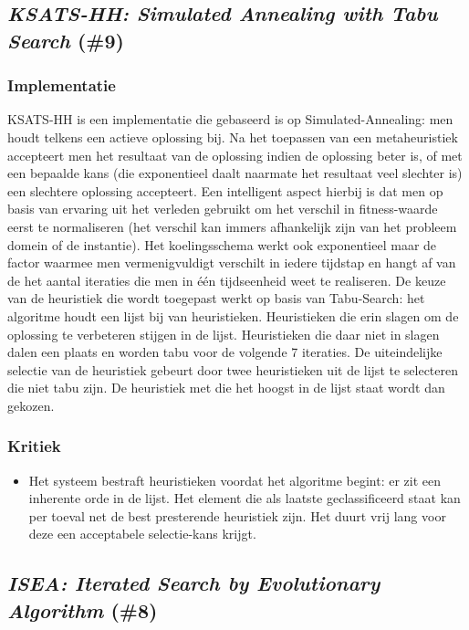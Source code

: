 \subsection{\emph{KSATS-HH: Simulated Annealing with Tabu Search} (\#9)}
\label{sss:ksats-hh}
\subsubsection{Implementatie}
KSATS-HH\cite{chesc-ksats-hh} is een implementatie die gebaseerd is op Si\-mu\-la\-ted-An\-nea\-ling: men houdt telkens een actieve oplossing bij. Na het toe\-passen van een metaheuristiek accepteert men het resultaat van de oplossing indien de oplossing beter is, of met een bepaalde kans (die exponentieel daalt naarmate het resultaat veel slechter is) een slechtere oplossing accepteert. Een intelligent aspect hierbij is dat men op basis van ervaring uit het verleden gebruikt om het verschil in fitness-waarde eerst te normaliseren (het verschil kan immers afhankelijk zijn van het probleem domein of de instantie). Het koelingsschema werkt ook exponentieel maar de factor waarmee men vermenigvuldigt verschilt in iedere tijdstap en hangt af van de het aantal iteraties die men in \'e\'en tijdseenheid weet te realiseren. De keuze van de heuristiek die wordt toegepast werkt op basis van Tabu-Search: het algoritme houdt een lijst bij van heuristieken. Heuristieken die erin slagen om de 
oplossing te verbeteren stijgen in de lijst. Heuristieken die daar niet in slagen dalen een plaats en worden tabu voor de volgende 7 iteraties. De uiteindelijke selectie van de heuristiek gebeurt door twee heuristieken uit de lijst te selecteren die niet tabu zijn. De heuristiek met die het hoogst in de lijst staat wordt dan gekozen.
\subsubsection{Kritiek}
\begin{itemize}
 \item Het systeem bestraft heuristieken voordat het algoritme begint: er zit een inherente orde in de lijst. Het element die als laatste geclassificeerd staat kan per toeval net de best presterende heuristiek zijn. Het duurt vrij lang voor deze een acceptabele selectie-kans krijgt.
\end{itemize}
\subsection{\emph{ISEA: Iterated Search by Evolutionary Algorithm} (\#8)}
\label{sss:isea}
